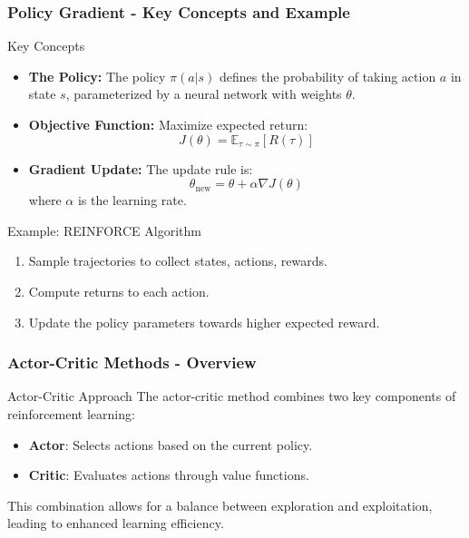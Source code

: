 \documentclass[aspectratio=169]{beamer}
\begin{document}
\begin{frame}[fragile]
    \frametitle{Policy Gradient - Key Concepts and Example}
    \begin{block}{Key Concepts}
        \begin{itemize}
            \item \textbf{The Policy:} The policy $\pi(a|s)$ defines the probability of taking action $a$ in state $s$, parameterized by a neural network with weights $\theta$.
            \item \textbf{Objective Function:} Maximize expected return:
            \begin{equation}
                J(\theta) = \mathbb{E}_{\tau \sim \pi}[R(\tau)]
            \end{equation}
            
            \item \textbf{Gradient Update:} The update rule is:
            \begin{equation}
                \theta_{\text{new}} = \theta + \alpha \nabla J(\theta)
            \end{equation}
            where $\alpha$ is the learning rate.
        \end{itemize}
    \end{block}

    \begin{block}{Example: REINFORCE Algorithm}
        \begin{enumerate}
            \item Sample trajectories to collect states, actions, rewards.
            \item Compute returns to each action.
            \item Update the policy parameters towards higher expected reward.
        \end{enumerate}
    \end{block}
\end{frame}

\begin{frame}[fragile]
    \frametitle{Actor-Critic Methods - Overview}
    \begin{block}{Actor-Critic Approach}
        The actor-critic method combines two key components of reinforcement learning:
        \begin{itemize}
            \item \textbf{Actor}: Selects actions based on the current policy.
            \item \textbf{Critic}: Evaluates actions through value functions.
        \end{itemize}
        This combination allows for a balance between exploration and exploitation, leading to enhanced learning efficiency.
    \end{block}
\end{frame}
\end{document}
